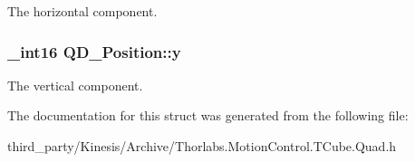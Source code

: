 The horizontal component. 

\subsubsection[{\texorpdfstring{y}{y}}]{\setlength{\rightskip}{0pt plus 5cm}\+\_\+int16 Q\+D\+\_\+\+Position\+::y}\hypertarget{struct_q_d___position_a164aef28fdd78de60013683960fda0bf}{}\label{struct_q_d___position_a164aef28fdd78de60013683960fda0bf}


The vertical component. 



The documentation for this struct was generated from the following file\+:\begin{DoxyCompactItemize}
\item 
third\+\_\+party/\+Kinesis/\+Archive/Thorlabs.\+Motion\+Control.\+T\+Cube.\+Quad.\+h\end{DoxyCompactItemize}
